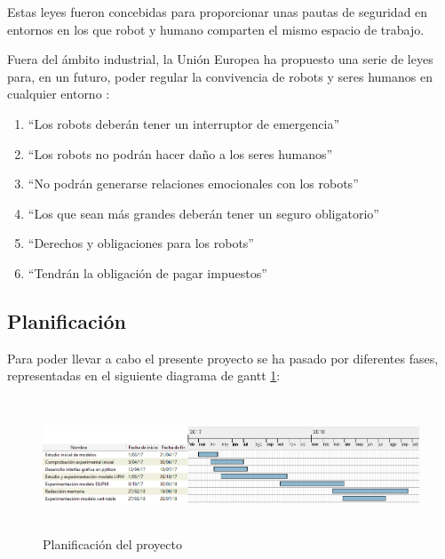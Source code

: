 Estas leyes fueron concebidas para proporcionar unas pautas de seguridad en entornos en los que robot y humano comparten el mismo espacio de trabajo.

Fuera del ámbito industrial, la Unión Europea ha propuesto una serie de leyes para, en un futuro, poder regular la convivencia de robots y seres humanos en cualquier entorno \cite{ref1}:

\begin{enumerate}

\item ``Los robots deberán tener un interruptor de emergencia''

\item ``Los robots no podrán hacer daño a los seres humanos''

\item ``No podrán generarse relaciones emocionales con los robots''

\item ``Los que sean más grandes deberán tener un seguro obligatorio''

\item ``Derechos y obligaciones para los robots''

\item ``Tendrán la obligación de pagar impuestos''

\end{enumerate}

\newpage

\subsection{Planificación}

Para poder llevar a cabo el presente proyecto se ha pasado por diferentes fases, representadas en el siguiente diagrama de gantt \ref{figura2}:

\begin{figure}[H]
\centering
\includegraphics[width=15cm, height=4cm]{imagenes/apartado_1/12_planificacion_v1}
\caption{Planificación del proyecto}
\label{figura2}
\end{figure}

